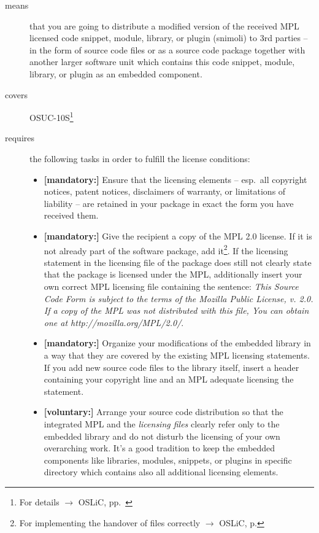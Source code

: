 \begin{description}
\item[means] that you are going to distribute a modified version of the received
MPL licensed code snippet, module, library, or plugin (snimoli) to 3rd parties
-- in the form of source code files or as a source code package together with
another larger software unit which contains this code snippet, module, library,
or plugin as an embedded component.
\item[covers] OSUC-10S\footnote{For details $\rightarrow$ OSLiC, pp.\
\pageref{OSUC-10S-DEF}}
\item[requires] the following tasks in order to fulfill the license conditions:
\begin{itemize}

  \item \textbf{[mandatory:]} Ensure that the licensing elements -- esp.\ all
  copyright notices, patent notices, disclaimers of warranty, or limitations of
  liability -- are retained in your package in exact the form you have received
  them.
  
  \item \textbf{[mandatory:]} Give the recipient a copy of the MPL 2.0 license.
  If it is not already part of the software package, add it\footnote{For
  implementing the handover of files correctly $\rightarrow$ OSLiC, p.
  \pageref{DistributingFilesHint}}. If the licensing statement in the licensing
  file of the package does still not clearly state that the package is licensed
  under the MPL, additionally insert your own correct MPL licensing file
  containing the sentence: \emph{This Source Code Form is subject to the terms
  of the Mozilla Public License, v. 2.0. If a copy of the MPL was not
  distributed with this file, You can obtain one at
  http://mozilla.org/MPL/2.0/}.

  \item \textbf{[mandatory:]} Organize your modifications of the embedded
  library in a way that they are covered by the existing MPL licensing
  statements. If you add new source code files to the library itself, insert a
  header containing your copyright line and an MPL adequate licensing the
  statement.
  
  \item \textbf{[voluntary:]} Arrange your source code distribution so that the
  integrated MPL and the \emph{licensing files} clearly refer only to the
  embedded library and do not disturb the licensing of your own overarching
  work. It's a good tradition to keep the embedded components like libraries,
  modules, snippets, or plugins in specific directory which contains also all
  additional licensing elements.



\end{itemize}
\end{description}
